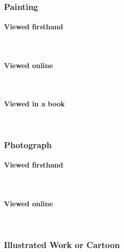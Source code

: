 \documentclass{ltxdockit}
\newcommand{\myparagraph}[1]{\paragraph{#1}\mbox{}\\}
\begin{document}
\subsubsection{Painting} %
\label{sub:painting}
\myparagraph{Viewed firsthand} %
\label{ssub:painting_viewed_firsthand}
\begin{refsection}
	\printbibliography[heading=none]
\end{refsection}
\myparagraph{Viewed online} %
\label{ssub:painting_viewed_online}
\begin{refsection}\citereset
	\printbibliography[heading=none]
\end{refsection}
\myparagraph{Viewed in a book} %
\label{ssub:painting_viewed_in_a_book}
\begin{refsection}\citereset
	\printbibliography[heading=none]
\end{refsection}
\subsubsection{Photograph} %
\label{sub:photograph}
\myparagraph{Viewed firsthand} %
\label{ssub:photo_viewed_firsthand}
\begin{refsection}
	\printbibliography[heading=none]
\end{refsection}
\myparagraph{Viewed online} %
\label{ssub:photo_viewed_online}
\begin{refsection}
	\printbibliography[heading=none]
\end{refsection}
\subsubsection{Illustrated Work or Cartoon} %
\label{sub:illustrated_work_or_cartoon}
\begin{refsection}
	\printbibliography[heading=none]
\end{refsection}
\end{document}
